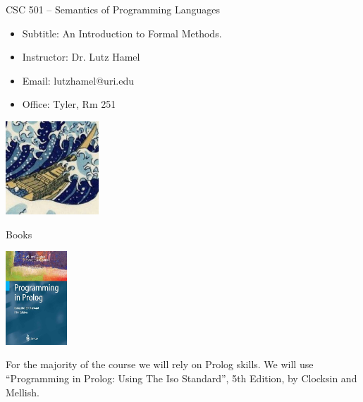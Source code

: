 \documentclass{beamer}
\begin{document}
\begin{frame}{CSC 501 -- Semantics of Programming Languages}
\begin{itemize}
\item Subtitle: An Introduction to Formal Methods.
\item	Instructor: Dr. Lutz Hamel
\item	Email: lutzhamel@uri.edu
\item	Office: Tyler, Rm 251
\end{itemize}

\vspace{.1in}

\begin{center}
    \includegraphics[height=35mm]{images/hokusai}
\end{center}

\end{frame}

\begin{frame}{Books}
\begin{center}
    \includegraphics[height=35mm]{images/programming-in-prolog}
\end{center}

For the majority of the course we will rely on Prolog skills.  We will use ``Programming in Prolog: Using The Iso Standard'', 5th Edition, by Clocksin and Mellish.

\end{frame}
\end{document}
